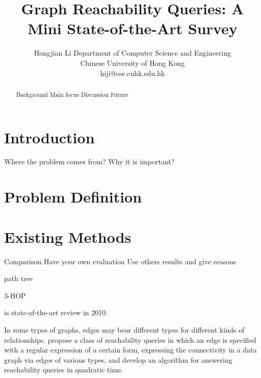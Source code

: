 \documentclass[12pt, conference, compsocconf]{../IEEEtran}
\begin{document}
\title{Graph Reachability Queries: A Mini State-of-the-Art Survey}
\author
{
\IEEEauthorblockN
{
Hongjian Li
\IEEEauthorblockA
{
Department of Computer Science and Engineering\\
Chinese University of Hong Kong\\
hiji@cse.cuhk.edu.hk
}
}
}
\maketitle

\begin{abstract}

Background
Main focus
Discussion
Future

\end{abstract}




\section{Introduction}

Where the problem comes from?
Why it is important?

\section{Problem Definition}



\section{Existing Methods}

Comparison
Have your own evaluation
Use others results and give reasons

\citep{1066} path tree

\citep{1067} 3-HOP

\citep{1063} is state-of-the-art review in 2010.

In some types of graphs, edges may bear different types for different kinds of relationships.  propose a class of reachability queries in which an edge is specified with a regular expression of a certain form, expressing the connectivity in a data graph via edges of various types, and develop an algorithm for answering reachability queries in quadratic time. \citep{1052}
\end{document}
